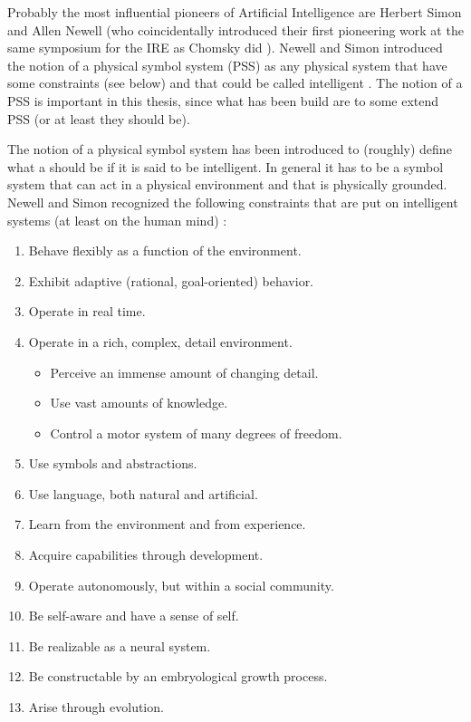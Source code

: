 
Probably the most influential pioneers of Artificial Intelligence are Herbert Simon and Allen Newell (who coincidentally introduced their first pioneering work at the same symposium for the IRE as Chomsky did \cite{newellsimon:1956}). Newell and Simon introduced the notion of a physical symbol system (PSS) as any physical system that have some constraints (see below) and that could be called intelligent \cite{newell:1980}. The notion of a PSS is important in this thesis, since what has been build  are to some extend PSS (or at least they should be).

\bigskip\noindent
The notion of a physical symbol system has been introduced to (roughly) define what a should be if it is said to be intelligent. In general it has to be a symbol system that can act in a physical environment and that is physically grounded. Newell and Simon recognized the following constraints that are put on intelligent systems (at least on the human mind) \cite[p.19]{newell:1990}:

\begin{enumerate}
\item Behave flexibly as a function of the environment.
\item Exhibit adaptive (rational, goal-oriented) behavior.
\item Operate in real time.
\item Operate in a rich, complex, detail environment.
\begin{itemize}
\item Perceive an immense amount of changing detail.
\item Use vast amounts of knowledge.
\item Control a motor system of many degrees of freedom.
\end{itemize}
\item Use symbols and abstractions.
\item Use language, both natural and artificial.
\item Learn from the environment and from experience.
\item Acquire capabilities through development.
\item Operate autonomously, but within a social community.
\item Be self-aware and have a sense of self.
\item Be realizable as a neural system.
\item Be constructable by an embryological growth process.
\item Arise through evolution.
\end{enumerate}

